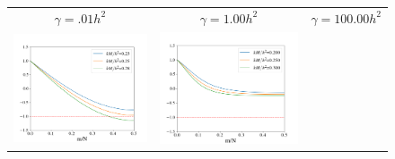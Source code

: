 \documentclass[12pt, reqno]{report}
\theoremstyle{definition}
\theoremstyle{remark}
\begin{document}
\begin{figure}[H]
    \centering
    
    \begin{tabular}{ccc}
        $\gamma=.01h^2$ & $\gamma=1.00h^2$ & $\gamma=100.00h^2$ \\
        \includegraphics[width = \ampwidth]{media_paper/ga0.01_CH_CN.png} &
        \includegraphics[width = \ampwidth]{media_paper/ga1_CH_CN.png} &

\end{tabular}
\end{figure}
\end{document}

